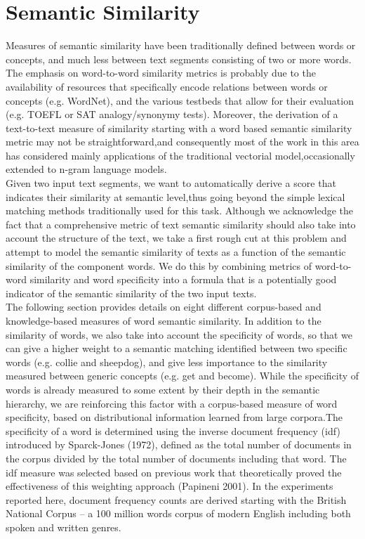 
\section{Semantic Similarity}
Measures of semantic similarity have been traditionally defined between words or concepts, and much less between text segments consisting of two or more words. The emphasis on word-to-word similarity metrics is probably due to the availability of resources that specifically encode relations between words or concepts (e.g. WordNet), and the various testbeds that allow for their evaluation (e.g. TOEFL or SAT analogy/synonymy tests). Moreover, the derivation of a text-to-text measure of similarity starting with a word based semantic similarity metric may not be straightforward,and consequently most of the work in this area has considered mainly applications of the traditional vectorial model,occasionally extended to n-gram language models\citep{semantic}.\\
Given two input text segments, we want to automatically derive a score that indicates their similarity at semantic level,thus going beyond the simple lexical matching methods traditionally used for this task. Although we acknowledge the fact that a comprehensive metric of text semantic similarity  should also take into account the structure of the text, we take a first rough cut at this problem and attempt to model the semantic similarity of texts as a function of the semantic similarity of the component words. We do this by combining metrics of word-to-word similarity and word specificity into a formula that is a potentially good indicator of the semantic similarity of the two input texts.\\
   The following section provides details on eight different corpus-based and knowledge-based measures of word semantic similarity. In addition to the similarity of words, we also take into account the specificity of words, so that we can give a higher weight to a semantic matching identified between two specific words (e.g. collie and sheepdog), and give less importance to the similarity measured between generic concepts (e.g. get and become). While the specificity of words is already measured to some extent by their depth in the semantic hierarchy, we are reinforcing this factor with a corpus-based measure of word specificity, based on distributional information learned from large corpora.The specificity of a word is determined using the inverse document frequency (idf) introduced by Sparck-Jones (1972), defined as the total number of documents in the corpus divided by the total number of documents including that word. The idf measure was selected based on previous work that theoretically proved the effectiveness of this weighting approach (Papineni 2001). In the experiments reported here, document frequency counts are derived starting with the British National Corpus – a 100 million words corpus of modern English including both spoken and written genres.\\
